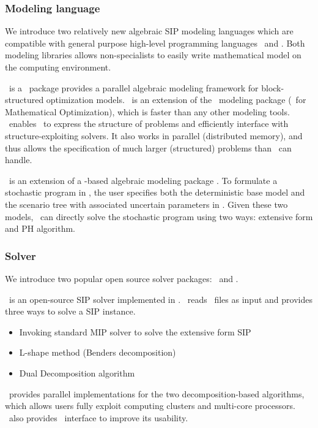 \subsubsection{Modeling language}
We introduce two relatively new algebraic SIP modeling languages which are compatible with general purpose high-level programming languages \julia\ and \python. Both modeling libraries allows non-specialists to easily write mathematical model on the computing environment.

\structjump\ is a \julia\ package provides a parallel algebraic modeling framework for block-structured optimization models. \structjump\ is an extension of the \jump\ modeling package (\julia\ for Mathematical Optimization), which is faster than any other modeling tools. \structjump\ enables \jump\ to express the structure of problems and efficiently interface with structure-exploiting solvers. It also works in parallel (distributed memory), and thus allows the specification of much larger (structured) problems than \jump\ can handle. 

\pysp\ is an extension of a \python-based algebraic modeling package \pyomo. To formulate a
stochastic program in \pysp, the user specifies both the deterministic base model and
the scenario tree with associated uncertain parameters in \pyomo. Given these two models, \pysp\ can directly solve the stochastic program using two ways: extensive form and PH algorithm. %

\subsubsection{Solver}
We introduce two popular open source solver packages: \dsp\ and \pysp. 
 
\dsp\ is an open-source SIP solver implemented in \cpp. \dsp\ reads \smps\ files as input and provides three ways to solve a SIP instance.
\begin{itemize}
	\item Invoking standard MIP solver to solve the extensive form SIP
	\item L-shape method (Benders decomposition)
	\item Dual Decomposition algorithm
\end{itemize}
\dsp\ provides parallel implementations for the two decomposition-based algorithms, which allows users fully exploit computing clusters and multi-core processors. \dsp\ also provides \julia\ interface to improve its usability.

